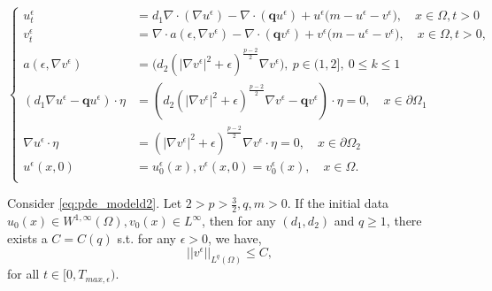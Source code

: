 \documentclass[10pt,a4paper]{amsart}
\begin{document}
\begin{equation}
\label{eq:pde_modeld2}
\left\{ \begin{array}{ll}
u^{\epsilon}_t &= d_1 \nabla \cdot (\nabla u^{\epsilon}) - \nabla\cdot (\textbf{q}  u^{\epsilon}) +  u^{\epsilon}\Big(m-u^{\epsilon}-v^{\epsilon}\Big), \quad x\in \Omega, t>0\\
		v^{\epsilon}_t &= \nabla \cdot a(\epsilon,\nabla v^{\epsilon})  - \nabla\cdot (\textbf{q}  v^{\epsilon}) + v^{\epsilon}\Big(m-u^{\epsilon}-v^{\epsilon}\Big), \quad x\in\Omega,t>0, \\
	 a(\epsilon,\nabla v^{\epsilon}) & = \Big(  d_2   \left(|\nabla v^{\epsilon}|^{2}+{\epsilon}\right)^{\frac{p-2}{2}}  \nabla v^{\epsilon} \Big) , \ p \in (1,2], \ 0 \leq k \leq 1 \\
 (d_{1}\nabla u^{\epsilon} - \textbf{q} u^{\epsilon})  \cdot \eta &= (d_2  \left(|\nabla v^{\epsilon}|^{2}+{\epsilon}\right)^{\frac{p-2}{2}}  \nabla v^{\epsilon} - \textbf{q} v^{\epsilon})  \cdot \eta =0, \quad x\in \partial \Omega_{1} \\
 \nabla u^{\epsilon} \cdot \eta &= \left(|\nabla v^{\epsilon}|^{2}+{\epsilon}\right)^{\frac{p-2}{2}}\nabla v^{\epsilon} \cdot \eta=0, \quad x\in \partial \Omega_{2} \\
		u^{\epsilon}(x,0)&=u^{\epsilon}_0(x), v^{\epsilon}(x,0)=v^{\epsilon}_{0} (x), \quad x\in \Omega . \\
\end{array}\right.
\end{equation}

\begin{theorem}
\label{thm:mt1-1}
    Consider \eqref{eq:pde_modeld2}. Let $2>p>\frac{3}{2}, q,m>0$. If the initial data $u_{0}(x) \in W^{1,\infty}(\Omega), v_{0}(x) \in L^{\infty}$, then for any $(d_{1},d_{2})$ and $q \geq 1$, there exists a $C=C(q)$ s.t. for any $ \epsilon > 0$, we have,
\begin{equation}
    ||v^{\epsilon}||_{L^{q}(\Omega)} \leq C,
\end{equation}
  for all $t \in [0, T_{max, \epsilon})$.
\end{theorem}
\end{document}
